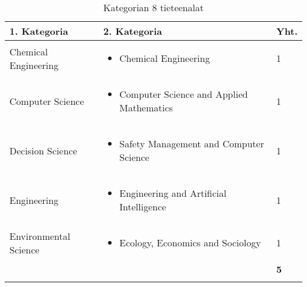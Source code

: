\documentclass[utf8]{gradu3}
\begin{document}
\begin{longtable}[h]{|p{5cm}|p{8cm}|p{1cm}|}
    \hline
    \textbf{1. Kategoria}    & \textbf{2. Kategoria} & \textbf{Yht.} \\
    \hline
    Chemical Engineering & \begin{itemize}
        \item Chemical Engineering
    \end{itemize} & 1 \\
    \hline
    Computer Science & \begin{itemize}
        \item Computer Science and Applied Mathematics
    \end{itemize} & 1 \\
    \hline
    Decision Science & \begin{itemize}
        \item Safety Management and Computer Science
    \end{itemize} & 1 \\
    \hline
    Engineering & \begin{itemize}
        \item Engineering and Artificial Intelligence
    \end{itemize} & 1 \\
    \hline
    Environmental Science & \begin{itemize}
        \item Ecology, Economics and Sociology
    \end{itemize} & 1 \\
    \hline
       &   & \textbf{5} \\
    \hline
    \caption{Kategorian 8 tieteenalat}
    \label{table:Kategorian 8 tieteenalat}
\end{longtable}
\end{document}
